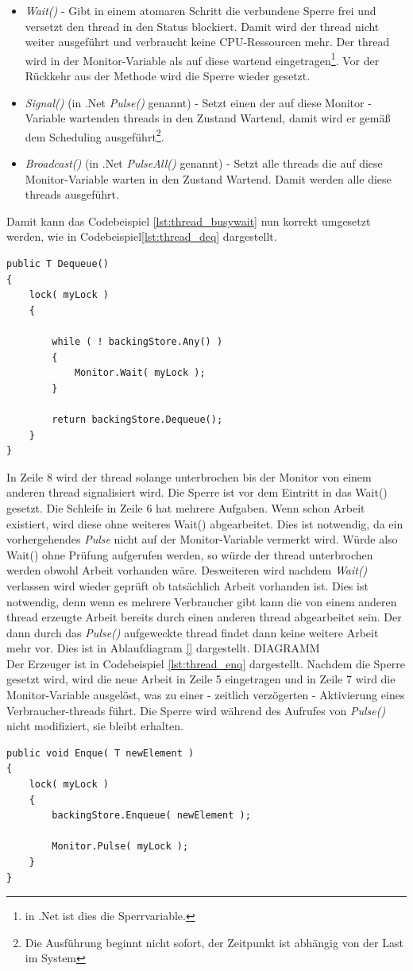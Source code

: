 \begin{itemize}
	\item \textit{Wait()} - Gibt in einem atomaren Schritt die verbundene Sperre frei und versetzt den thread in den Status blockiert. Damit wird der thread nicht weiter ausgeführt und verbraucht keine CPU-Ressourcen mehr. Der thread wird in der Monitor-Variable als auf diese wartend eingetragen\footnote{in .Net ist dies die Sperrvariable.}. Vor der Rückkehr aus der Methode wird die Sperre wieder gesetzt.
	\item \textit{Signal()} (in .Net \textit{Pulse()} genannt) - Setzt einen der auf diese Monitor -Variable wartenden threads in den Zustand Wartend, damit wird er gemäß dem Scheduling ausgeführt\footnote{Die Ausführung beginnt nicht sofort, der Zeitpunkt ist abhängig von der Last im System}.
	\item \textit{Broadcast()} (in .Net \textit{PulseAll()} genannt) - Setzt alle threads die auf diese Monitor-Variable warten in den Zustand Wartend. Damit werden alle diese threads ausgeführt.
\end{itemize}
 Damit kann das Codebeispiel \ref{lst:thread_busywait} nun korrekt umgesetzt werden, wie in Codebeispiel\ref{lst:thread_deq} dargestellt.
\begin{lstlisting}[caption={Thread Monitor.Wait()},label={lst:thread_deq},captionpos=b]
public T Dequeue()
{
	lock( myLock )
	{

		while ( ! backingStore.Any() )
		{
			Monitor.Wait( myLock );
		}

		return backingStore.Dequeue();
	}
}
\end{lstlisting}
In Zeile 8 wird der thread solange unterbrochen bis der Monitor von einem anderen thread signalisiert wird. Die Sperre ist vor dem Eintritt in das Wait() gesetzt. Die Schleife in Zeile 6 hat mehrere Aufgaben. Wenn schon Arbeit existiert, wird diese ohne weiteres Wait() abgearbeitet. Dies ist notwendig, da ein vorhergehendes \textit{Pulse} nicht auf der Monitor-Variable vermerkt wird. Würde also Wait() ohne Prüfung aufgerufen werden, so würde der thread unterbrochen werden obwohl Arbeit vorhanden wäre. Desweiteren wird nachdem \textit{Wait()} verlassen wird wieder geprüft ob tatsächlich Arbeit vorhanden ist. Dies ist notwendig, denn wenn es mehrere Verbraucher gibt kann die von einem anderen thread erzeugte Arbeit bereits durch einen anderen thread abgearbeitet sein. Der dann durch das \textit{Pulse()} aufgeweckte thread findet dann keine weitere Arbeit mehr vor. Dies ist in Ablaufdiagram \ref{} dargestellt.
DIAGRAMM
\\Der Erzeuger ist in Codebeispiel \ref{lst:thread_enq} dargestellt. Nachdem die Sperre gesetzt wird, wird die neue Arbeit in Zeile 5 eingetragen und in Zeile 7 wird die Monitor-Variable ausgelöst, was zu einer - zeitlich verzögerten - Aktivierung eines Verbraucher-threads führt. Die Sperre wird während des Aufrufes von \textit{Pulse()} nicht modifiziert, sie bleibt erhalten.
\begin{lstlisting}[caption={Thread Monitor.Pulse()},label={lst:thread_enq},captionpos=b]
public void Enque( T newElement )
{
	lock( myLock )
	{
		backingStore.Enqueue( newElement );

		Monitor.Pulse( myLock );
	}
}
\end{lstlisting}
